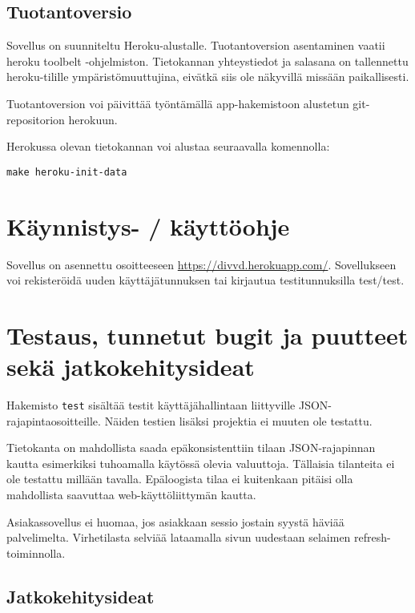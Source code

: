 \documentclass[a4paper,parskip=half]{scrartcl}
\begin{document}
\subsection{Tuotantoversio}

Sovellus on suunniteltu Heroku-alustalle. Tuotantoversion asentaminen
vaatii heroku toolbelt -ohjelmiston. Tietokannan yhteystiedot ja salasana
on tallennettu heroku-tilille ympäristömuuttujina, eivätkä siis ole näkyvillä
missään paikallisesti.

Tuotantoversion voi päivittää työntämällä app-hakemistoon alustetun
git-repositorion herokuun.

Herokussa olevan tietokannan voi alustaa seuraavalla komennolla:
\begin{Verbatim}
make heroku-init-data
\end{Verbatim}

\section{Käynnistys- / käyttöohje}
Sovellus on asennettu osoitteeseen \url{https://divvd.herokuapp.com/}.
Sovellukseen voi rekisteröidä uuden käyttäjätunnuksen tai kirjautua
testitunnuksilla test/test.

\section{Testaus, tunnetut bugit ja puutteet sekä jatkokehitysideat}

Hakemisto \texttt{test} sisältää testit käyttäjähallintaan liittyville
JSON-rajapintaosoitteille. Näiden testien lisäksi projektia ei muuten
ole testattu.

Tietokanta on mahdollista saada epäkonsistenttiin tilaan JSON-rajapinnan
kautta esimerkiksi tuhoamalla käytössä olevia valuuttoja. Tällaisia tilanteita
ei ole testattu millään tavalla. Epäloogista tilaa ei kuitenkaan pitäisi olla
mahdollista saavuttaa web-käyttöliittymän kautta.

Asiakassovellus ei huomaa, jos asiakkaan sessio jostain syystä häviää
palvelimelta. Virhetilasta selviää lataamalla sivun uudestaan selaimen
refresh-toiminnolla.

\subsection{Jatkokehitysideat}
\end{document}
